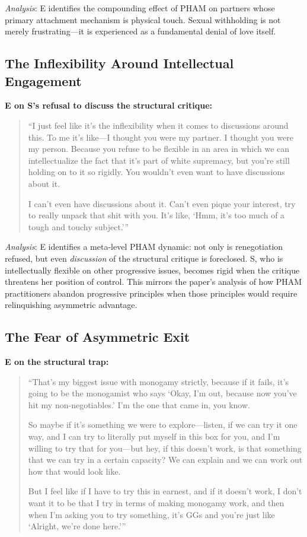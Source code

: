 \documentclass[12pt,openany]{book}
\numberwithin{equation}{chapter}
\begin{document}
\textit{Analysis}: E identifies the compounding effect of PHAM on partners whose primary attachment mechanism is physical touch. Sexual withholding is not merely frustrating---it is experienced as a fundamental denial of love itself.

\subsection{The Inflexibility Around Intellectual Engagement}

\textbf{E on S's refusal to discuss the structural critique:}
\begin{quote}
``I just feel like it's the inflexibility when it comes to discussions around this. To me it's like---I thought you were my partner. I thought you were my person. Because you refuse to be flexible in an area in which we can intellectualize the fact that it's part of white supremacy, but you're still holding on to it so rigidly. You wouldn't even want to have discussions about it.

I can't even have discussions about it. Can't even pique your interest, try to really unpack that shit with you. It's like, `Hmm, it's too much of a tough and touchy subject.'''
\end{quote}

\textit{Analysis}: E identifies a meta-level PHAM dynamic: not only is renegotiation refused, but even \textit{discussion} of the structural critique is foreclosed. S, who is intellectually flexible on other progressive issues, becomes rigid when the critique threatens her position of control. This mirrors the paper's analysis of how PHAM practitioners abandon progressive principles when those principles would require relinquishing asymmetric advantage.

\subsection{The Fear of Asymmetric Exit}

\textbf{E on the structural trap:}
\begin{quote}
``That's my biggest issue with monogamy strictly, because if it fails, it's going to be the monogamist who says `Okay, I'm out, because now you've hit my non-negotiables.' I'm the one that came in, you know.

So maybe if it's something we were to explore---listen, if we can try it one way, and I can try to literally put myself in this box for you, and I'm willing to try that for you---but hey, if this doesn't work, is that something that we can try in a certain capacity? We can explain and we can work out how that would look like.

But I feel like if I have to try this in earnest, and if it doesn't work, I don't want it to be that I try in terms of making monogamy work, and then when I'm asking you to try something, it's GGs and you're just like `Alright, we're done here.'''
\end{quote}
\end{document}
